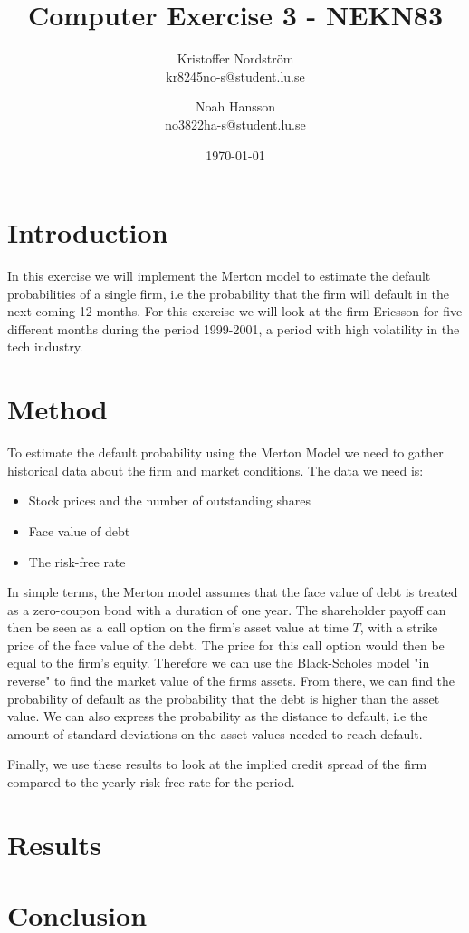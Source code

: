 \documentclass[a4paper]{article}
\title{Computer Exercise 3 - NEKN83}
\author{Kristoffer Nordström \\ kr8245no-s@student.lu.se \and  Noah Hansson \\ no3822ha-s@student.lu.se}
\date{\today}
\begin{document}
\maketitle

\section{Introduction}
In this exercise we will implement the Merton model to estimate the default probabilities of a single firm, i.e the probability that the firm will default in the next coming 12 months. For this exercise we will look at the firm Ericsson for five different months during the period 1999-2001, a period with high volatility in the tech industry.

\section{Method}
To estimate the default probability using the Merton Model we need to gather historical data about the firm and market conditions. The data we need is:
\begin{itemize}
    \item Stock prices and the number of outstanding shares
    \item Face value of debt
    \item The risk-free rate
\end{itemize}

In simple terms, the Merton model assumes that the face value of debt is treated as a zero-coupon bond with a duration of one year. The shareholder payoff can then be seen as a call option on the firm's asset value at time $T$, with a strike price of the face value of the debt. The price for this call option would then be equal to the firm's equity. Therefore we can use the Black-Scholes model "in reverse" to find the market value of the firms assets. From there, we can find the probability of default as the probability that the debt is higher than the asset value. We can also express the probability as the distance to default, i.e the amount of standard deviations on the asset values needed to reach default.

Finally, we use these results to look at the implied credit spread of the firm compared to the yearly risk free rate for the period.

\section{Results}



\section{Conclusion}
\end{document}
